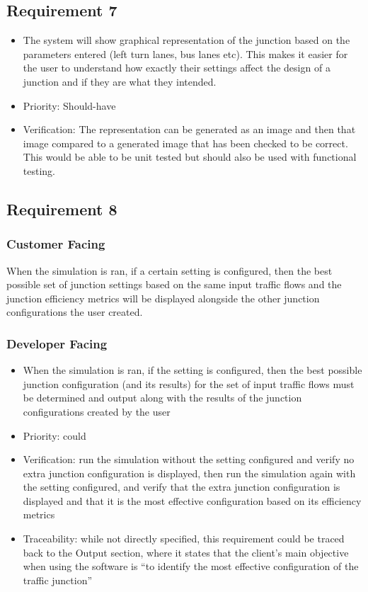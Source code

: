 \documentclass{article}
\begin{document}
\subsection{Requirement 7}
\begin{itemize}
  \item The system will show graphical representation of the junction based on the parameters entered (left turn lanes, bus lanes etc). This makes it easier for the user to understand how exactly their settings affect the design of a junction and if they are what they intended.
  \item Priority: Should-have 
  \item Verification: The representation can be generated as an image and then that image compared to a generated image that has been checked to be correct. This would be able to be unit tested but should also be used  with functional testing.
\end{itemize}

\subsection{Requirement 8}
\subsubsection{Customer Facing}
When the simulation is ran, if a certain setting is configured, then the best 
possible set of junction settings based on the same input traffic flows and the 
junction efficiency metrics will be displayed alongside the other junction 
configurations the user created.
\subsubsection{Developer Facing}
\begin{itemize}
  \item When the simulation is ran, if the setting is configured, then the best 
  possible junction configuration (and its results) for the set of input traffic 
  flows must be determined and output along with the results of the junction 
  configurations created by the user
  \item Priority: could
  \item Verification: run the simulation without the setting configured and verify 
  no extra junction configuration is displayed, then run the simulation again with 
  the setting configured, and verify that the extra junction configuration is displayed 
  and that it is the most effective configuration based on its efficiency metrics
  \item Traceability: while not directly specified, this requirement could be traced back 
  to the Output section, where it states that the client’s main objective when using 
  the software is “to identify the most effective configuration of the traffic junction”
\end{itemize}
\end{document}
